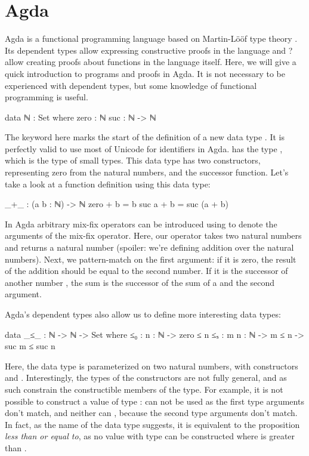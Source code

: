 \chapter{Agda}

	Agda is a functional programming language based on Martin-Lööf type theory
	\cite{?}. Its dependent types allow expressing constructive proofs in the
	language and ? allow creating proofs about functions in the language
	itself. Here, we will give a quick introduction to programs and proofs in
	Agda. It is not necessary to be experienced with dependent types, but some
	knowledge of functional programming is useful.

	\begin{code}
		data ℕ : Set where
		  zero : ℕ
		  suc : ℕ -> ℕ
	\end{code}

	The keyword  here marks the start of the definition of a new
	data type . It is perfectly valid to use most of Unicode for
	identifiers in Agda.  has the type , which is the
	type of small types. This data type has two constructors, 
	representing zero from the natural numbers, and  the successor
	function. Let's take a look at a function definition using this data type:

	\begin{code}
		_+_ : (a b : ℕ) -> ℕ
		zero + b = b
		suc a + b = suc (a + b)
	\end{code}

	In Agda arbitrary mix-fix operators can be introduced using \codett{\_} to
	denote the arguments of the mix-fix operator. Here, our operator
	\codett{\_+\_} takes two natural numbers and returns a natural number
	(spoiler: we're defining addition over the natural numbers). Next, we
	pattern-match on the first argument: if it is zero, the result of the
	addition should be equal to the second number. If it is the successor of
	another number , the sum is the successor of the sum of a and
	the second argument.

	Agda's dependent types also allow us to define more interesting data types:

	\begin{code}
		data _≤_ : ℕ -> ℕ -> Set where
		  ≤₀ : {n : ℕ} -> zero ≤ n
		  ≤ₛ : {m n : ℕ} -> m ≤ n -> suc m ≤ suc n
	\end{code}

	Here, the data type  is parameterized on two natural numbers,
	with constructors  and . Interestingly, the types of
	the constructors are not fully general, and as such constrain the
	constructible members of the type. For example, it is not possible to
	construct a value of type :  can not be
	used as the first type arguments don't match, and neither can ,
	because the second type arguments don't match. In fact, as the name of the
	data type suggests, it is equivalent to the proposition \emph{less than or
	equal to}, as no value with type  can be constructed where
	 is greater than .

